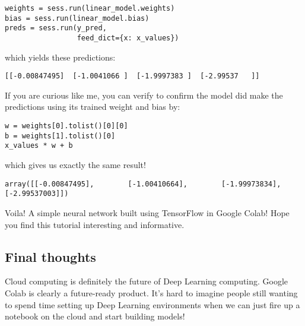 \begin{lstlisting}
weights = sess.run(linear_model.weights)
bias = sess.run(linear_model.bias)
preds = sess.run(y_pred, 
                 feed_dict={x: x_values})
\end{lstlisting}
which yields these predictions:

\begin{lstlisting}
[[-0.00847495]  [-1.0041066 ]  [-1.9997383 ]  [-2.99537   ]]
\end{lstlisting}
If you are curious like me, you can verify to confirm the model did make the predictions using its trained weight and bias by:

\begin{lstlisting}
w = weights[0].tolist()[0][0]
b = weights[1].tolist()[0]
x_values * w + b
\end{lstlisting}
which gives us exactly the same result!

\begin{lstlisting}
array([[-0.00847495],        [-1.00410664],        [-1.99973834],        [-2.99537003]])
\end{lstlisting}
Voila! A simple neural network built using TensorFlow in Google Colab! Hope you find this tutorial interesting and informative.

\subsection{Final thoughts}

Cloud computing is definitely the future of Deep Learning computing. Google Colab is clearly a future-ready product. It's hard to imagine people still wanting to spend time setting up Deep Learning environments when we can just fire up a notebook on the cloud and start building models!


